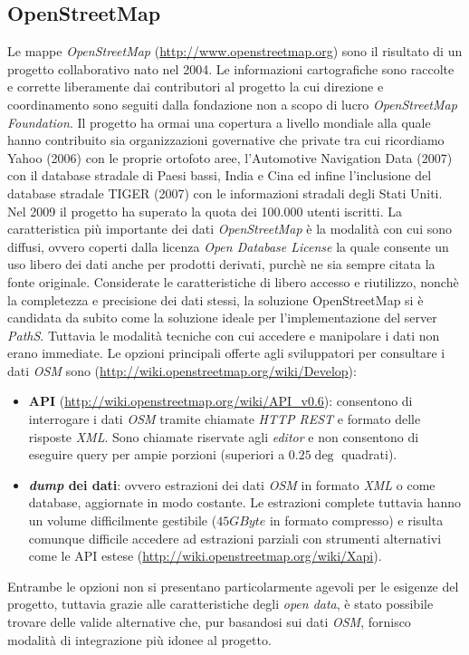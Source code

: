 \subsection{OpenStreetMap}
Le mappe \emph{OpenStreetMap} (\url{http://www.openstreetmap.org}) sono il risultato di un progetto collaborativo nato nel 2004. Le informazioni cartografiche sono raccolte e corrette liberamente dai contributori al progetto la cui direzione e coordinamento sono seguiti dalla fondazione non a scopo di lucro \emph{OpenStreetMap Foundation}. Il progetto ha ormai una copertura a livello mondiale alla quale hanno contribuito sia organizzazioni governative che private tra cui ricordiamo Yahoo (2006) con le proprie ortofoto aree, l'Automotive Navigation Data (2007) con il database stradale di Paesi bassi, India e Cina ed infine l'inclusione del database stradale TIGER (2007) con le informazioni stradali degli Stati Uniti. Nel 2009 il progetto ha superato la quota dei 100.000 utenti iscritti. La caratteristica più importante dei dati \emph{OpenStreetMap} è la modalità con cui sono diffusi, ovvero coperti dalla licenza \emph{Open Database License} la quale consente un uso libero dei dati anche per prodotti derivati, purchè ne sia sempre citata la fonte originale.
Considerate le caratteristiche di libero accesso e riutilizzo, nonchè la completezza e precisione dei dati stessi, la soluzione OpenStreetMap si è candidata da subito come la soluzione ideale per l'implementazione del server \emph{PathS}. Tuttavia le modalità tecniche con cui accedere e manipolare i dati non erano immediate. Le opzioni principali offerte agli sviluppatori per consultare i dati \emph{OSM} sono (\url{http://wiki.openstreetmap.org/wiki/Develop}):
\begin{itemize}
  \item \textbf{API} (\url{http://wiki.openstreetmap.org/wiki/API_v0.6}): consentono di interrogare i dati \emph{OSM} tramite chiamate \emph{HTTP REST} e formato delle risposte \emph{XML}. Sono chiamate riservate agli \emph{editor} e non consentono di eseguire query per ampie porzioni (superiori a $0.25\deg$ quadrati).    
  \item \textbf{\emph{dump} dei dati}: ovvero estrazioni dei dati \emph{OSM} in formato \emph{XML} o come database, aggiornate in modo costante. Le estrazioni complete tuttavia hanno un volume difficilmente gestibile ($45GByte$ in formato compresso) e risulta comunque difficile accedere ad estrazioni parziali con strumenti alternativi come le API estese (\url{http://wiki.openstreetmap.org/wiki/Xapi}). 
\end{itemize}
Entrambe le opzioni non si presentano particolarmente agevoli per le esigenze del progetto, tuttavia grazie alle caratteristiche degli \emph{open data}, è stato possibile trovare delle valide alternative che, pur basandosi sui dati \emph{OSM}, fornisco modalità di integrazione più idonee al progetto.


